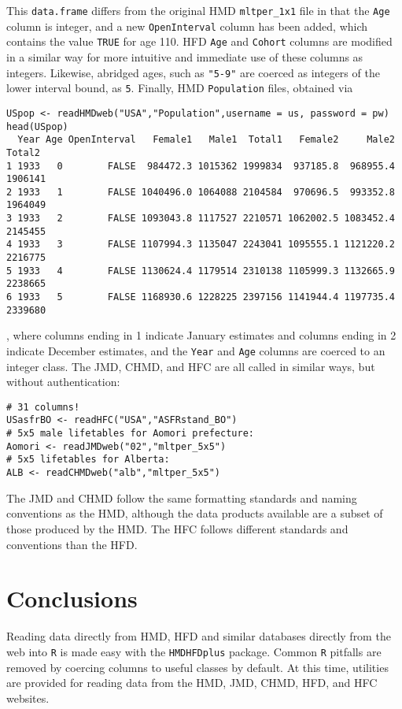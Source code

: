 \documentclass{article}
\begin{document}
This \texttt{data.frame} differs from the original HMD \texttt{mltper\_1x1} file
in that the \texttt{Age} column is integer, and a new \texttt{OpenInterval}
column has been added, which contains the value \texttt{TRUE} for age 110. HFD
\texttt{Age} and \texttt{Cohort} columns are modified in a similar way for more
intuitive and immediate use of these columns as integers. Likewise, abridged
ages, such as \texttt{"5-9"} are coerced as integers of the
lower interval bound, as \texttt{5}. Finally, HMD \texttt{Population} files, obtained via
\begin{small}
\begin{verbatim}
USpop <- readHMDweb("USA","Population",username = us, password = pw)
head(USpop)
  Year Age OpenInterval   Female1   Male1  Total1   Female2     Male2  Total2
1 1933   0        FALSE  984472.3 1015362 1999834  937185.8  968955.4 1906141
2 1933   1        FALSE 1040496.0 1064088 2104584  970696.5  993352.8 1964049
3 1933   2        FALSE 1093043.8 1117527 2210571 1062002.5 1083452.4 2145455
4 1933   3        FALSE 1107994.3 1135047 2243041 1095555.1 1121220.2 2216775
5 1933   4        FALSE 1130624.4 1179514 2310138 1105999.3 1132665.9 2238665
6 1933   5        FALSE 1168930.6 1228225 2397156 1141944.4 1197735.4 2339680
\end{verbatim}
\end{small}
, where columns ending in 1 indicate January  estimates and columns
ending in 2 indicate December  estimates, and the \texttt{Year} and
\texttt{Age} columns are coerced to an integer class. The JMD, CHMD, and HFC
are all called in similar ways, but without authentication:
\begin{small}
\begin{verbatim}
# 31 columns!
USasfrBO <- readHFC("USA","ASFRstand_BO")
# 5x5 male lifetables for Aomori prefecture:
Aomori <- readJMDweb("02","mltper_5x5")
# 5x5 lifetables for Alberta:
ALB <- readCHMDweb("alb","mltper_5x5")
\end{verbatim}
\end{small}
The JMD and CHMD follow the same formatting standards and naming conventions as
the HMD, although the data products available are a subset of those produced by
the HMD. The HFC follows different standards and conventions than the HFD.

\section{Conclusions}
Reading data directly from HMD, HFD and similar databases directly from the web
into \texttt{R} is made easy with the \texttt{HMDHFDplus} package. Common
\texttt{R} pitfalls are removed by coercing columns to useful classes by
default. At this time, utilities are provided for reading data from the HMD,
JMD, CHMD, HFD, and HFC websites. 
\end{document}
